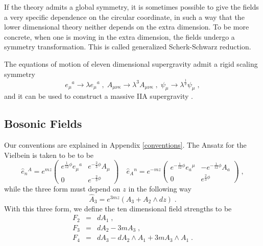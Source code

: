 \documentclass[a4paper,12pt]{article}
\begin{document}
If the theory admits a global symmetry, it is sometimes possible to give the fields a very specific dependence on the circular coordinate, in such a way that the lower dimensional theory neither depends on the extra dimension. To be more concrete, when one is moving in the extra dimension, the fields undergo a symmetry transformation. This is called generalized Scherk-Schwarz reduction.
  
The equations of motion of eleven dimensional supergravity \cite{Cremmer:1978km} admit a rigid scaling symmetry
\begin{equation}\label{scaling}
e_\mu{}^a \rightarrow \lambda e_\mu{}^a \; , \; A_{\mu \nu \kappa} \rightarrow \lambda^3 A_{\mu \nu \kappa}\; , \;
\psi_\mu \rightarrow \lambda^{\frac{1}{2}} \psi_\mu \; ,
\end{equation}
and it can be used to construct a massive IIA supergravity \cite{Lavrinenko:1998qa}.
\subsection{Bosonic Fields}
Our conventions are explained in Appendix \ref{conventions}. The Ansatz for the Vielbein is taken to be to be
\begin{equation} \label{ansatze}
\hat{e}_{n}{}^{A}=e^{mz}\left(
 \begin{array}{cc}
 e^{\frac{1}{12}\phi}e_\mu{}^a & e^{-\frac{2}{3} \phi}A_\mu \\
 0& e^{-\frac{2}{3} \phi}
 \end{array} \right)
 \quad
\hat{e}_{A}{}^{n}=e^{-mz}\left(
 \begin{array}{cc}
 e^{-\frac{1}{12}\phi}e_a {}^\mu & - e^{-\frac{1}{12} \phi}A_a \\
 0& e^{\frac{2}{3} \phi}
 \end{array} \right)\; , 
\end{equation}
while the three form must depend on $z$ in the following way
\begin{equation}
\hat{A}_3=e^{3mz}(A_3+A_2 \wedge dz)\; .
\end{equation}
With this three form, we define the ten dimensional field strengths to be
\begin{eqnarray}
F_2&=& dA_1\; ,\nonumber\\
F_3&=& dA_2-3mA_3\; ,\nonumber\\
F_4&=&dA_3-dA_2\wedge A_1+3mA_3\wedge A_1\; .
\end{eqnarray}
\end{document}
